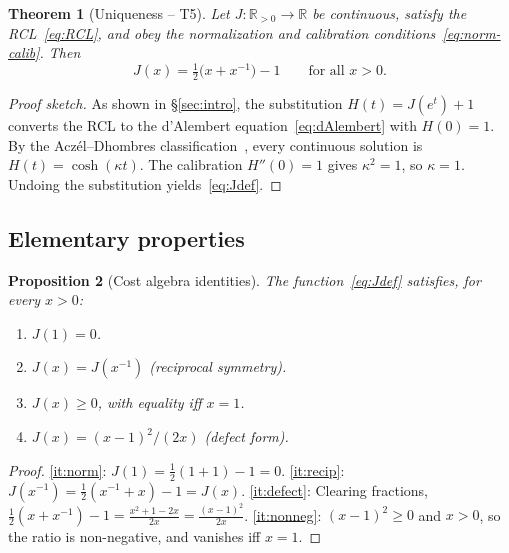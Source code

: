 \documentclass[11pt,a4paper]{article}
\theoremstyle{plain}
\newtheorem{theorem}{Theorem}[section]
\newtheorem{proposition}[theorem]{Proposition}
\theoremstyle{definition}
\theoremstyle{remark}
\newcommand{\Jcost}{J}
\newcommand{\RR}{\mathbb{R}}
\begin{document}
\begin{theorem}[Uniqueness -- T5]\label{thm:T5}
Let $\Jcost:\RR_{>0}\to\RR$ be continuous, satisfy the
RCL~\eqref{eq:RCL}, and obey the normalization and calibration
conditions~\eqref{eq:norm-calib}.  Then
\begin{equation}\label{eq:Jdef}
  \Jcost(x)=\tfrac12\bigl(x+x^{-1}\bigr)-1
  \qquad\text{for all } x>0.
\end{equation}
\end{theorem}

\begin{proof}[Proof sketch]
As shown in \S\ref{sec:intro}, the substitution
$H(t)=\Jcost(e^t)+1$ converts the RCL to the d'Alembert
equation~\eqref{eq:dAlembert} with $H(0)=1$.  By the
Acz\'el--Dhombres classification~\cite{aczel_dhombres1989},
every continuous solution is $H(t)=\cosh(\kappa t)$.  The calibration
$H''(0)=1$ gives $\kappa^2=1$, so $\kappa=1$.  Undoing the
substitution yields~\eqref{eq:Jdef}.
\end{proof}

\subsection{Elementary properties}

\begin{proposition}[Cost algebra identities]\label{prop:J-props}
The function~\eqref{eq:Jdef} satisfies, for every $x>0$:
\begin{enumerate}[nosep,label=\textup{(\alph*)}]
\item\label{it:norm} $\Jcost(1)=0$.
\item\label{it:recip} $\Jcost(x)=\Jcost(x^{-1})$
      \textup{(reciprocal symmetry)}.
\item\label{it:nonneg} $\Jcost(x)\ge0$, with equality iff $x=1$.
\item\label{it:defect} $\Jcost(x)=(x-1)^2/(2x)$
      \textup{(defect form)}.
\end{enumerate}
\end{proposition}

\begin{proof}
\ref{it:norm}:
$\Jcost(1)=\frac12(1+1)-1=0$.
\ref{it:recip}:
$\Jcost(x^{-1})=\frac12(x^{-1}+x)-1=\Jcost(x)$.
\ref{it:defect}: Clearing fractions,
$\frac12(x+x^{-1})-1=\frac{x^2+1-2x}{2x}=\frac{(x-1)^2}{2x}$.
\ref{it:nonneg}: $(x-1)^2\ge0$ and $x>0$, so the ratio is
non-negative, and vanishes iff $x=1$.
\end{proof}
\end{document}
